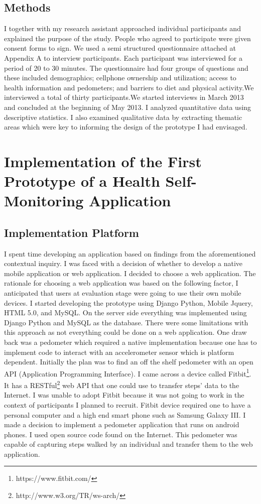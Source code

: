 \subsection{Methods}
I together with my research assistant approached individual participants and explained the purpose of the study. People who agreed to participate were given consent forms to sign. We used a semi structured questionnaire attached at Appendix A to interview participants. Each participant was interviewed for a period of 20 to 30 minutes. The questionnaire had four groups of questions and these included demographics; cellphone ownership and utilization; access to health information and pedometers; and barriers to diet and physical activity.We interviewed a total of thirty participants.We started interviews in March 2013 and concluded at the beginning of May 2013. I analyzed quantitative data using descriptive statistics. I also examined qualitative data by extracting thematic areas which were key to informing the design of the prototype I had envisaged.\newline
\section{Implementation of the First Prototype of a Health Self-Monitoring Application}
\subsection{Implementation Platform}
I spent time developing an application based on findings from the aforementioned contextual inquiry. I was faced with a decision of whether to develop a native mobile application or web application. I decided to choose a web application. The rationale for choosing a web application was based on the following factor, I anticipated that users at evaluation stage were going to use their own mobile devices.\newline
I started developing the prototype using Django Python, Mobile Jquery, HTML 5.0, and MySQL. On the server side everything was implemented using Django Python and MySQL as the database. There were some limitations with this approach as not everything could be done on a web application. One draw back was a pedometer which required a native implementation because one has to implement code to interact with an accelerometer sensor which is platform dependent. Initially the plan was to find an off the shelf pedometer with an open API (Application Programming Interface). I came across a device called Fitbit\footnote{ https://www.fitbit.com/}. It has a RESTful\footnote{http://www.w3.org/TR/ws-arch/} web API that one could use to transfer steps' data to the Internet. I was unable to adopt Fitbit because it was not going to work in the context of participants I planned to recruit. Fitbit device required one to have a personal computer and a high end smart phone such as Samsung Galaxy III.\newline
I made a decision to implement a pedometer application that runs on android phones. I used open source code found on the Internet. This pedometer was capable of capturing steps walked by an individual and transfer them to the web application.\newline
